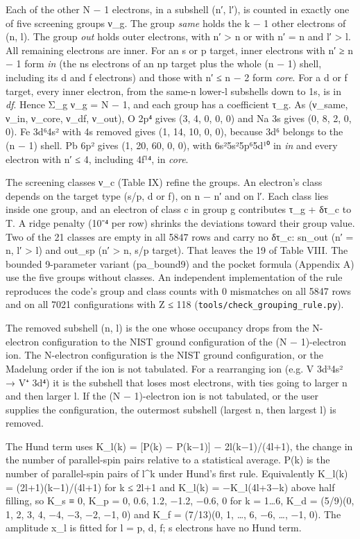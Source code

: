 \documentclass[aps,pra,preprint,superscriptaddress,amsmath,amssymb]{revtex4-2}
\begin{document}
Each of the other N − 1 electrons, in a subshell (n′, l′), is counted in exactly one of five screening groups ν\_g. The group \emph{same} holds the k − 1 other electrons of (n, l). The group \emph{out} holds outer electrons, with n′ > n or with n′ = n and l′ > l. All remaining electrons are inner. For an s or p target, inner electrons with n′ ≥ n − 1 form \emph{in} (the ns electrons of an np target plus the whole (n − 1) shell, including its d and f electrons) and those with n′ ≤ n − 2 form \emph{core}. For a d or f target, every inner electron, from the same-n lower-l subshells down to 1s, is in \emph{df}. Hence Σ\_g ν\_g = N − 1, and each group has a coefficient τ\_g. As (ν\_same, ν\_in, ν\_core, ν\_df, ν\_out), O 2p⁴ gives (3, 4, 0, 0, 0) and Na 3s gives (0, 8, 2, 0, 0). Fe 3d⁶4s² with 4s removed gives (1, 14, 10, 0, 0), because 3d⁶ belongs to the (n − 1) shell. Pb 6p² gives (1, 20, 60, 0, 0), with 6s²5s²5p⁶5d¹⁰ in \emph{in} and every electron with n′ ≤ 4, including 4f¹⁴, in \emph{core}.


The screening classes ν\_c (Table IX) refine the groups. An electron's class depends on the target type (s/p, d or f), on n − n′ and on l′. Each class lies inside one group, and an electron of class c in group g contributes τ\_g + δτ\_c to T. A ridge penalty (10⁻⁴ per row) shrinks the deviations toward their group value. Two of the 21 classes are empty in all 5847 rows and carry no δτ\_c: sn\_out (n′ = n, l′ > l) and out\_sp (n′ > n, s/p target). That leaves the 19 of Table VIII. The bounded 9-parameter variant (pa\_bound9) and the pocket formula (Appendix A) use the five groups without classes. An independent implementation of the rule reproduces the code's group and class counts with 0 mismatches on all 5847 rows and on all 7021 configurations with Z ≤ 118 (\texttt{tools/check\_grouping\_rule.py}).


The removed subshell (n, l) is the one whose occupancy drops from the N-electron configuration to the NIST ground configuration of the (N − 1)-electron ion. The N-electron configuration is the NIST ground configuration, or the Madelung order if the ion is not tabulated. For a rearranging ion (e.g. V 3d³4s² → V⁺ 3d⁴) it is the subshell that loses most electrons, with ties going to larger n and then larger l. If the (N − 1)-electron ion is not tabulated, or the user supplies the configuration, the outermost subshell (largest n, then largest l) is removed.


The Hund term uses K\_l(k) = [P(k) − P(k−1)] − 2l(k−1)/(4l+1), the change in the number of parallel-spin pairs relative to a statistical average. P(k) is the number of parallel-spin pairs of l\textasciicircum{}k under Hund's first rule. Equivalently K\_l(k) = (2l+1)(k−1)/(4l+1) for k ≤ 2l+1 and K\_l(k) = −K\_l(4l+3−k) above half filling, so K\_s ≡ 0, K\_p = 0, 0.6, 1.2, −1.2, −0.6, 0 for k = 1…6, K\_d = (5/9)(0, 1, 2, 3, 4, −4, −3, −2, −1, 0) and K\_f = (7/13)(0, 1, …, 6, −6, …, −1, 0). The amplitude x\_l is fitted for l = p, d, f; s electrons have no Hund term.
\end{document}
